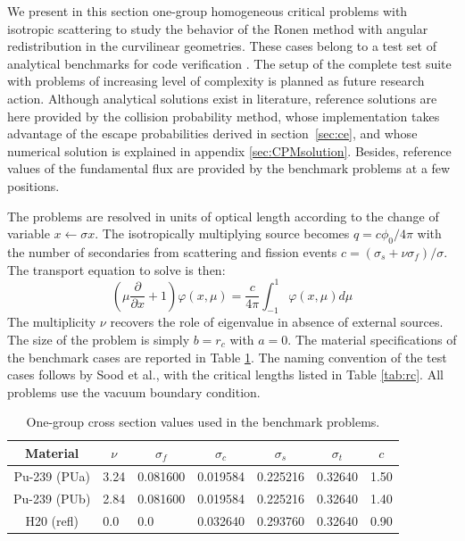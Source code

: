 \documentclass{ictt26}
\begin{document}
We present in this section one-group homogeneous critical problems with isotropic scattering to study the behavior of the Ronen method with angular redistribution in the curvilinear geometries. These cases belong to a test set of analytical benchmarks for code verification \cite{sood2003analytical}. The setup of the complete test suite with problems of increasing level of complexity is planned as future research action. Although analytical solutions exist in literature, reference solutions are here provided by the collision probability method, whose implementation takes advantage of the escape probabilities derived in section~\ref{sec:ce}, and whose numerical solution is explained in appendix \ref{sec:CPMsolution}. Besides, reference values of the fundamental flux are provided by the benchmark problems at a few positions.

The problems are resolved in units of optical length according to the change of variable $x \leftarrow \sigma x$. The isotropically multiplying source becomes $q = c \phi_0 / 4\pi$ with the number of secondaries from scattering and fission events $c = (\sigma_s + \nu \sigma_f)/\sigma$. The transport equation to solve is then:
\[
\left( \mu \frac{\partial}{\partial x} + 1\right) \varphi(x,\mu)
 = \frac{c}{4 \pi}\int_{-1}^{1}{\varphi(x,\mu) d\mu}
\]
The multiplicity $\nu$ recovers the role of eigenvalue in absence of external sources. The size of the problem is simply $b=r_c$ with $a=0$. %
The material specifications of the benchmark cases are reported in Table \ref{tab:xs}. The naming convention of the test cases follows by Sood et al., with the critical lengths listed in Table \ref{tab:rc}. All problems use the vacuum boundary condition. %

\begin{table}[htb]
\centering
\caption{One-group cross section values used in the benchmark problems.}\label{tab:xs}
\begin{tabular}{c|*{6}{l}}
Material & \multicolumn{1}{c}{$\nu$} & \multicolumn{1}{c}{$\sigma_f$} & \multicolumn{1}{c}{$\sigma_c$} & \multicolumn{1}{c}{$\sigma_s$} & \multicolumn{1}{c}{$\sigma_t$} & \multicolumn{1}{c}{$c$}\\ \hline
Pu-239 (PUa)& 3.24 & 0.081600 & 0.019584 & 0.225216 & 0.32640 & 1.50\\
Pu-239 (PUb)& 2.84 & 0.081600 & 0.019584 & 0.225216 & 0.32640 & 1.40\\
  H20 (refl)& 0.0 & 0.0 & 0.032640 & 0.293760 & 0.32640 & 0.90\\
\end{tabular}
\end{table}
\end{document}
